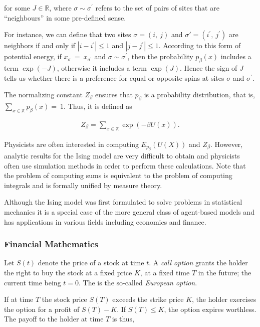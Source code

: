 for some \(J\mathbb{\in R}\), where \(\sigma \sim \sigma^{\prime}\) refers to
the set of pairs of sites that are ``neighbours'' in some pre-defined
sense.

For instance, we can deﬁne that two sites \(\sigma = (i,\ j)\) and
\(\sigma' = (i^{\prime},\ j^{\prime})\) are neighbors if and only if
\(\left| i - i^{\prime} \right| \leq 1\) and
\(\left| j - j^{\prime} \right| \leq 1\). According to this form of potential
energy, if \(x_{\sigma}\  = \ x_{\sigma^{\prime}}\) and
\(\sigma \sim \sigma^{\prime}\), then the probability \(p_{\beta}(x)\)
includes a term \(\exp{( - J)}\), otherwise it includes a term
\(\exp{(J)}\). Hence the sign of \(J\) tells us whether there is a
preference for equal or opposite spins at sites \(\sigma\) and
\(\sigma^{\prime}\).

The normalizing constant \(Z_{\beta}\) ensures that \(p_{\beta}\) is a
probability distribution, that is,
\(\sum_{x \in \mathbb{X}}^{}{p_{\beta}(x)} = \ 1\). Thus, it is deﬁned
as

\begin{align}Z_{\beta} = \sum_{x \in \mathbb{X}}^{}{\exp\left( - \beta U(x) \right)}.\end{align}

Physicists are often interested in computing \(E_{p_{\beta}}(U(X))\) and
\(Z_{\beta}\). However, analytic results for the Ising model are very
diﬃcult to obtain and physicists often use simulation methods in order
to perform these calculations. Note that the problem of computing sums
is equivalent to the problem of computing integrals and is formally
uniﬁed by measure theory.

Although the Ising model was first formulated to solve problems in
statistical mechanics it is a special case of the more general class of
agent-based models and has applications in various fields including
economics and finance.

\subsubsection{Financial Mathematics}\label{financial-mathematics}

Let \(S(t)\) denote the price of a stock at time \(t\). A \emph{call
option} grants the holder the right to buy the stock at a ﬁxed price
\(K\), at a ﬁxed time \(T\) in the future; the current time being
\(t = 0\). The is the so-called \emph{European option}.

If at time \(T\) the stock price \(S(T)\) exceeds the strike price
\(K\), the holder exercises the option for a proﬁt of \(S(T) - K\). If
\(S(T) \leq K\), the option expires worthless. The payoﬀ to the holder
at time \(T\) is thus,


